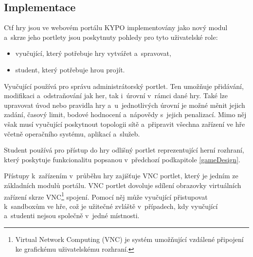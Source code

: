 \documentclass[
  digital, %
  oneside, %
  table,   %
  nolof,     %
  nolot,     %
]{fithesis3}
\begin{document}
\subsection{Implementace}
Ctf hry jsou ve webovém portálu KYPO implementovány jako nový modul a~skrze jeho portlety jsou poskytnuty pohledy pro tyto uživatelské role:
\begin{itemize}
  \item vyučující, který potřebuje hry vytvářet a~spravovat,
  \item student, který potřebuje hrou projít.
\end{itemize}
Vyučující používá pro správu administrátorský portlet. Ten umožňuje přidávání, modifikaci a~odstraňování jak her, tak i~úrovní v~rámci dané hry. Také lze upravovat úvod nebo pravidla hry a~u~jednotlivých úrovní je možné měnit jejich zadání, časový limit, bodové hodnocení a~nápovědy s~jejich penalizací. Mimo něj však musí vyučující poskytnout topologii sítě a~připravit všechna zařízení ve hře včetně operačního systému, aplikací a~služeb. \cite{ctfDesign, Dankovcikova2015thesis}\par
Student používá pro přístup do hry odlišný portlet reprezentující herní rozhraní, který poskytuje funkcionalitu popsanou v~předchozí podkapitole \ref{gameDesign}.\par
Přístupy k~zařízením v~průběhu hry zajišťuje VNC portlet, který je jedním ze základních modulů portálu. VNC portlet dovoluje sdílení obrazovky virtuálních zařízení skrze VNC\footnote{Virtual Network Computing (VNC) je systém umožňující vzdálené připojení ke grafickému uživatelskému rozhraní.} spojení. Pomocí něj může vyučující přistupovat k~sandboxům ve hře, což je užitečné zvláště v~případech, kdy vyučující a~studenti nejsou společně v~jedné místnosti.\cite{ctfDesign}
\end{document}
